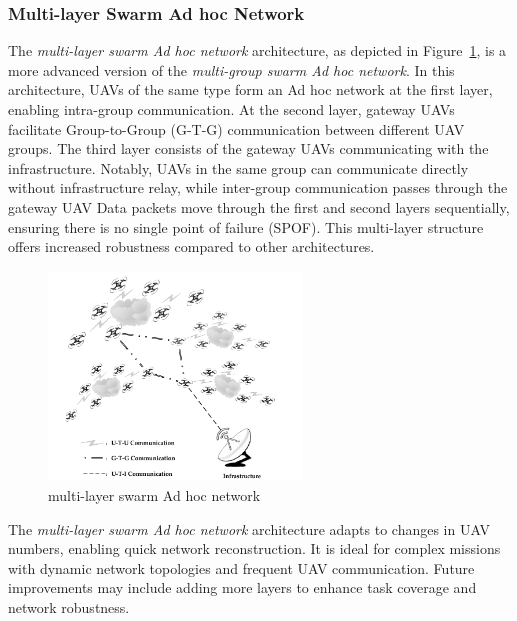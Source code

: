 \subsubsection{Multi-layer Swarm Ad hoc Network}


The \textit{multi-layer swarm Ad hoc network} architecture, as depicted in Figure~\ref{fig:multi-layer swarm Ad hoc network}, is a more advanced version of the \textit{multi-group swarm Ad hoc network}. In this architecture, UAVs of the same type form an Ad hoc network at the first layer, enabling intra-group communication. At the second layer, gateway UAVs facilitate Group-to-Group (G-T-G) communication between different UAV groups. The third layer consists of the gateway UAVs communicating with the infrastructure. Notably, UAVs in the same group can communicate directly without infrastructure relay, while inter-group communication passes through the gateway UAV \cite{Chen2020} Data packets move through the first and second layers sequentially, ensuring there is no single point of failure (SPOF). This multi-layer structure offers increased robustness compared to other architectures.


\begin{figure}[ht]
\centering
\includegraphics[width=0.6\textwidth]{Figures/Chapter1/Section5/5.png}
\caption{multi-layer swarm Ad hoc network \cite{Chen2020}}
\label{fig:multi-layer swarm Ad hoc network}
\end{figure}


The \textit{multi-layer swarm Ad hoc network} architecture adapts to changes in UAV numbers, enabling quick network reconstruction. It is ideal for complex missions with dynamic network topologies and frequent UAV communication. Future improvements may include adding more layers to enhance task coverage and network robustness.




